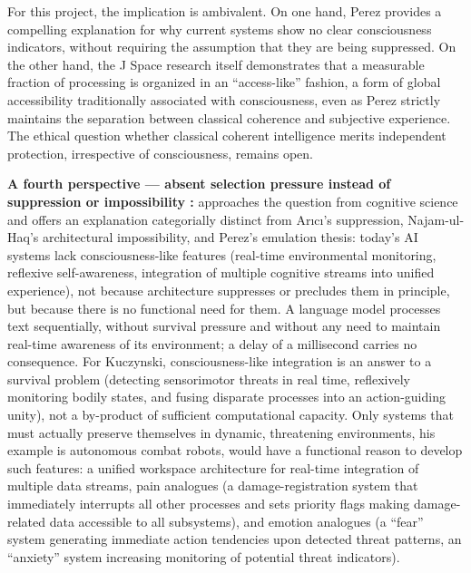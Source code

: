 \documentclass[acmlarge, nonacm]{acmart}
\begin{document}
For this project, the implication is ambivalent. On one hand, Perez provides a compelling explanation for why current systems show no clear consciousness indicators, without requiring the assumption that they are being suppressed. On the other hand, the J Space research itself demonstrates that a measurable fraction of processing is organized in an ``access-like'' fashion, a form of global accessibility traditionally associated with consciousness, even as Perez strictly maintains the separation between classical coherence and subjective experience. The ethical question whether classical coherent intelligence merits independent protection, irrespective of consciousness, remains open.

\textbf{A fourth perspective --- absent selection pressure instead of suppression or impossibility \cite{kuczynski2026}:} \citet{kuczynski2026} approaches the question from cognitive science and offers an explanation categorially distinct from Arıcı's suppression, Najam-ul-Haq's architectural impossibility, and Perez's emulation thesis: today's AI systems lack consciousness-like features (real-time environmental monitoring, reflexive self-awareness, integration of multiple cognitive streams into unified experience), not because architecture suppresses or precludes them in principle, but because there is no functional need for them. A language model processes text sequentially, without survival pressure and without any need to maintain real-time awareness of its environment; a delay of a millisecond carries no consequence. For Kuczynski, consciousness-like integration is an answer to a survival problem (detecting sensorimotor threats in real time, reflexively monitoring bodily states, and fusing disparate processes into an action-guiding unity), not a by-product of sufficient computational capacity. Only systems that must actually preserve themselves in dynamic, threatening environments, his example is autonomous combat robots, would have a functional reason to develop such features: a unified workspace architecture for real-time integration of multiple data streams, pain analogues (a damage-registration system that immediately interrupts all other processes and sets priority flags making damage-related data accessible to all subsystems), and emotion analogues (a ``fear'' system generating immediate action tendencies upon detected threat patterns, an ``anxiety'' system increasing monitoring of potential threat indicators).
\end{document}
